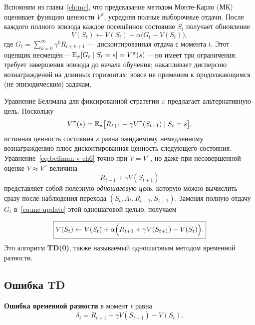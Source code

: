 Вспомним из главы~\ref{ch:mc}, что предсказание методом Монте-Карло (МК) оценивает функцию ценности $V^\pi$, усредняя полные выборочные отдачи.  После каждого полного эпизода каждое посещённое состояние $S_t$ получает обновление
\begin{equation}
\label{eq:mc-update}
V(S_t) \leftarrow V(S_t) + \alpha\bigl(G_t - V(S_t)\bigr),
\end{equation}
где $G_t = \sum_{k=0}^{\infty}\gamma^k R_{t+k+1}$ --- дисконтированная отдача с момента $t$.  Этот оценщик несмещён\,---\,$\operatorname{\mathbb{E}}_\pi[G_t \mid S_t = s] = V^\pi(s)$\,---\,но имеет три ограничения: требует завершения эпизода до начала обучения; накапливает дисперсию вознаграждений на длинных горизонтах; вовсе не применим к продолжающимся (не эпизодическим) задачам.

Уравнение Беллмана для фиксированной стратегии $\pi$ предлагает альтернативную цель.  Поскольку
\begin{equation}
\label{eq:bellman-v-ch6}
V^\pi(s) = \operatorname{\mathbb{E}}_\pi\bigl[R_{t+1} + \gamma V^\pi(S_{t+1}) \mid S_t = s\bigr],
\end{equation}
истинная ценность состояния $s$ равна ожидаемому немедленному вознаграждению плюс дисконтированная ценность следующего состояния.  Уравнение~\eqref{eq:bellman-v-ch6} точно при $V = V^\pi$, но даже при несовершенной оценке $V \approx V^\pi$ величина
\begin{equation}
\label{eq:td0-target}
R_{t+1} + \gamma V(S_{t+1})
\end{equation}
представляет собой полезную \emph{одношаговую цель}, которую можно вычислить сразу после наблюдения перехода $(S_t, A_t, R_{t+1}, S_{t+1})$.  Заменяя полную отдачу $G_t$ в~\eqref{eq:mc-update} этой одношаговой целью, получаем

\begin{equation}
\label{eq:td0-update}
\boxed{V(S_t) \leftarrow V(S_t) + \alpha\Bigl(R_{t+1} + \gamma V(S_{t+1}) - V(S_t)\Bigr).}
\end{equation}
Это алгоритм \textbf{TD(0)}, также называемый одношаговым методом временной разности.

\subsection{Ошибка TD}

\begin{definition}[Ошибка TD]
\label{def:td-error}
\textbf{Ошибка временной разности} в момент $t$ равна
\begin{equation}
\label{eq:td-error}
\delta_t = R_{t+1} + \gamma V(S_{t+1}) - V(S_t).
\end{equation}
\end{definition}

